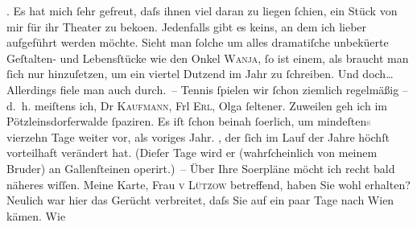 \begin{ledgroupsized}[t]{13cm}
{{{               }}}\label{K_L03004-3h}. Es hat mich ſehr gefreut, daſs ihnen
               viel daran zu liegen ſchien, ein Stück von mir für ihr Theater zu beko{\geminationm}en. Jedenfalls gibt es keins, an dem ich lieber
               aufgeführt werden möchte. Sieht man ſolche {\pb}um alles dramatiſche unbekü{\geminationm}erte Geſtalten- und
               Lebensſtücke wie den Onkel \textsc{Wanja}, ſo ist einem, als braucht man ſich nur hinzuſetzen, um ein viertel Dutzend im
               Jahr zu ſchreiben. Und doch{\dots} Allerdings fiele man auch
               durch. –\pend
           \pstart
           Tennis ſpielen wir ſchon ziemlich regelmäßig – d. h. meiſtens ich, Dr \textsc{Kaufmann}, Frl \textsc{Erl}, Olga ſeltener. Zuweilen geh ich im Pötzleinsdorferwalde ſpaziren. Es iſt ſchon beinah
                  ſo{\geminationm}erlich, um mindeſten\textcolor{gray}{s} vierzehn
               Tage weiter vor, als voriges Jahr. \label{K_L03004-4v}\label{K_L03004-4h}, der ſich im Lauf der Jahre höchſt vorteilhaft verändert hat. (Dieſer {\pb}Tage wird er (wahrſcheinlich von meinem Bruder) an Gallenſteinen
               operirt.) –\pend
           \pstart
           Über Ihre So{\geminationm}erpläne möcht ich recht bald näheres
               wiſſen. Meine Karte, Frau \textsc{v Lützow} betreffend, haben Sie wohl erhalten? Neulich war hier das Gerücht verbreitet,
               daſs Sie auf ein paar Tage nach Wien kämen. Wie

\end{ledgroupsized}
